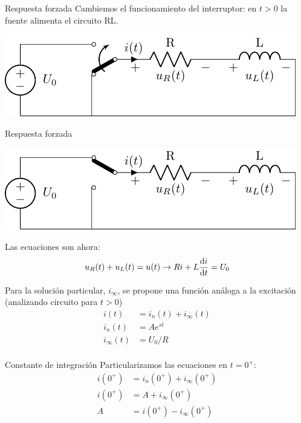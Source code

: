 \documentclass[aspectratio=169, usenames,svgnames,dvipsnames]{beamer}
\begin{document}
\begin{frame}[label={sec:org8688b1d}]{Respuesta forzada}
Cambiemos el funcionamiento del interruptor: en \(t > 0\) la fuente alimenta el circuito RL.
\begin{center}
\includegraphics[width=.9\linewidth]{figs/transitorio_circuitoRL2.pdf}
\end{center}
\end{frame}

\begin{frame}[label={sec:org59b44b3}]{Respuesta forzada}
\begin{center}
\includegraphics[height=0.25\textheight]{figs/transitorio_circuitoRL2_t0+.pdf}
\end{center}
Las ecuaciones son ahora:
\[
  u_R(t) + u_L(t) = u(t) \rightarrow R i + L\diff{i}{t} = U_0
\]

Para la solución particular, \(i_\infty\), se propone una función análoga a la excitación (analizando circuito para \(t > 0\))
\begin{align*}
  i(t) &= i_n(t) + i_\infty(t)\\
  i_n(t) &= A e^{st}\\
  i_\infty(t) &= U_0/R\\
\end{align*}
\end{frame}

\begin{frame}[label={sec:orgb2c96a7}]{Constante de integración}
Particularizamos las ecuaciones en \(t = 0^+\):
\begin{align*}
  i(0^+) &= i_n(0^+) + i_\infty(0^+)\\
  i(0^+) &= A + i_\infty(0^+)\\
  A &= i(0^+) - i_\infty(0^+)
\end{align*}
\end{frame}
\end{document}
